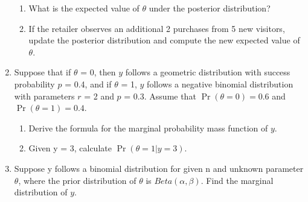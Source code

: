 \documentclass[12pt,a4paper,twoside]{article}
\begin{document}
\begin{enumerate}
\begin{enumerate}[label=$(\alph*)$]
        \item What is the expected value of $\theta$ under the posterior distribution?
        \item If the retailer observes an additional 2 purchases from 5 new visitors, update the
        posterior distribution and compute the new expected value of $\theta$.
    \end{enumerate}
    \item Suppose that if $\theta$ = 0, then $y$ follows a geometric distribution with success probability
    $p$ = 0.4, and if $\theta$ = 1, $y$ follows a negative binomial distribution with parameters $r$ = 2
    and $p$ = 0.3. Assume that $\Pr(\theta = 0) = 0.6$ and $\Pr(\theta = 1) = 0.4$.
    \begin{enumerate}[label=$(\alph*)$]
        \item Derive the formula for the marginal probability mass function of $y$.
        \item Given y = 3, calculate $\Pr(\theta = 1|y = 3)$.
    \end{enumerate}
    \item Suppose y follows a binomial distribution for given n and unknown parameter $\theta$, where the
    prior distribution of $\theta$ is $Beta(\alpha, \beta)$. Find the marginal distribution of $y$.
\end{enumerate}
\end{document}
